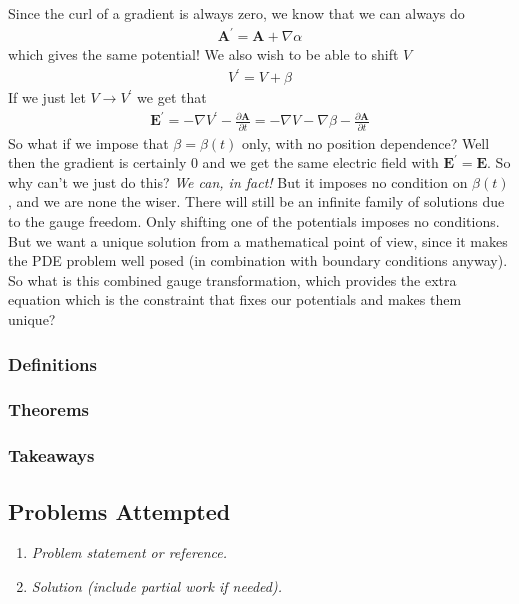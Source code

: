 Since the curl of a gradient is always zero, we know that we can always do \begin{align*}
    \mathbf{A}^{\prime} = \mathbf{A} + \nabla \alpha
\end{align*}
which gives the same potential! We also wish to be able to shift \(V\) \begin{align*}
    V^{\prime} = V + \beta 
\end{align*}
If we just let \(V \to V^{\prime} \) we get that \begin{align*}
    \mathbf{E^{\prime} } = - \nabla V^{\prime} - \frac{\partial \mathbf{A}}{\partial t} = -\nabla V - \nabla \beta - \frac{\partial \mathbf{A}}{\partial t} 
\end{align*}
So what if we impose that \(\beta = \beta (t)\) only, with no position dependence? Well then the gradient is certainly 0 and we get the same electric field with \(\mathbf{E}^{\prime} = \mathbf{E}\). So why can't we just do this? \textit{We can, in fact!} But it imposes no condition on \(\beta (t)\), and we are none the wiser. There will still be an infinite family of solutions due to the gauge freedom. Only shifting one of the potentials imposes no conditions. But we want a unique solution from a mathematical point of view, since it makes the PDE problem well posed (in combination with boundary conditions anyway). So what is this combined gauge transformation, which provides the extra equation which is the constraint that fixes our potentials and makes them unique?

\subsubsection*{Definitions} 
\subsubsection*{Theorems}
\subsubsection*{Takeaways}

\subsection*{Problems Attempted}
\begin{enumerate}
    \item \textit{Problem statement or reference.}
    \item \textit{Solution (include partial work if needed).}
\end{enumerate}

